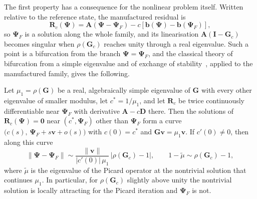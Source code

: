 The first property has a consequence for the nonlinear problem itself. Written relative to the reference state, the manufactured residual is
\begin{equation}
\mathbf{R}_c(\bm{\Psi})=\mathbf{A}(\bm{\Psi}-\bm{\Psi}_F)-c\left[\mathbf{b}(\bm{\Psi})-\mathbf{b}(\bm{\Psi}_F)\right] ,
\label{eq:family_residual}
\end{equation}
so $\bm{\Psi}_F$ is a solution along the whole family, and its linearisation $\mathbf{A}(\mathbf{I}-\mathbf{G}_c)$ becomes singular when $\rho(\mathbf{G}_c)$ reaches unity through a real eigenvalue. Such a point is a bifurcation from the branch $\bm{\Psi}=\bm{\Psi}_F$, and the classical theory of bifurcation from a simple eigenvalue and of exchange of stability~\cite{Crandall1971BifurcationEigenvalues,Crandall1973BifurcationStability}, applied to the manufactured family, gives the following.

\begin{proposition}
\label{prop:bifurcation}
Let $\mu_{1}=\rho(\mathbf{G})$ be a real, algebraically simple eigenvalue of $\mathbf{G}$ with every other eigenvalue of smaller modulus, let $c^{\ast}=1/\mu_{1}$, and let $\mathbf{R}_c$ be twice continuously differentiable near $\bm{\Psi}_F$ with derivative $\mathbf{A}-c\mathbf{D}$ there. Then the solutions of $\mathbf{R}_c(\bm{\Psi})=\mathbf{0}$ near $(c^{\ast},\bm{\Psi}_F)$ other than $\bm{\Psi}_F$ form a curve $\bigl(c(s),\,\bm{\Psi}_F+s\mathbf{v}+o(s)\bigr)$ with $c(0)=c^{\ast}$ and $\mathbf{G}\mathbf{v}=\mu_{1}\mathbf{v}$. If $c'(0)\neq0$, then along this curve
\begin{equation}
\|\bm{\Psi}-\bm{\Psi}_F\| \sim \frac{\|\mathbf{v}\|}{|c'(0)|\,\mu_{1}}\,\bigl|\rho(\mathbf{G}_c)-1\bigr| ,
\qquad
1-\tilde{\mu} \sim \rho(\mathbf{G}_c)-1 ,
\label{eq:bifurcation_scaling}
\end{equation}
where $\tilde{\mu}$ is the eigenvalue of the Picard operator at the nontrivial solution that continues $\mu_{1}$. In particular, for $\rho(\mathbf{G}_c)$ slightly above unity the nontrivial solution is locally attracting for the Picard iteration and $\bm{\Psi}_F$ is not.
\end{proposition}

